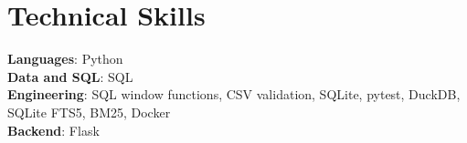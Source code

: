 \section{Technical Skills}
\begin{itemize}[leftmargin=0.15in, label={}]
\small{\item{\strut
\textbf{Languages}: Python \\
\textbf{Data and SQL}: SQL \\
\textbf{Engineering}: SQL window functions, CSV validation, SQLite, pytest, DuckDB, SQLite FTS5, BM25, Docker \\
\textbf{Backend}: Flask \\
}}
\end{itemize}

